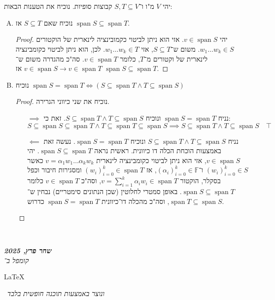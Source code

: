 \documentclass[]{article}
\newcommand\en[1] {\begin{otherlanguage}{english}#1\end{otherlanguage}}
\newcommand\ndoc  {\dotfill \\ \vfil {\begin{center}
			{\textbf{\textit{שחר פרץ, 2025}} \\
				\scriptsize \textit{קומפל ב־}\en{\LaTeX}\,\textit{ ונוצר באמצעות תוכנה חופשית בלבד}}
	\end{center}} \vfil	}
\DeclareMathOperator{\Sp}     {span}
\newcommand\F         {\mathbb{F}}
\newcommand\ag        {\alpha}
\theoremstyle{definition}
\begin{document}
	\section{}
	יהי $V$ מ"ו ו־$S, T \subseteq V$ קבוצות סופיות. נוכיח את הטענות הבאות: 
	\begin{enumerate}[(A)]
		\item נוכיח שאם $S \subseteq T$ אז $\Sp S \subseteq \Sp T$. \begin{proof}
			יהי $v \in \Sp S$. אזי הוא ניתן לביטוי כקמובינציה לינארית של הוקטורים $w_1 \dots w_k \in S$. משום ש־$S \subseteq T$, אזי $w_1 \dots w_k \in T$. לכן, הוא ניתן לביטוי כקומבינציה לינארית של וקטורים מ־$T$, כלומר $v \in \Sp T$. סה"כ מהגדרה משום ש־$v \in \Sp S \rightarrow v \in \Sp T$ אז $\Sp S \subseteq \Sp T$. 
		\end{proof}
		\item נוכיח $\Sp S = \Sp T \iff (S \subseteq \Sp T \land T \subseteq \Sp S)$ \begin{proof}נוכיח את שני כיווני הגרירה. 
			\begin{itemize}
				\item[$\implies$]נניח $\Sp S = \Sp T$ ונוכיח $S \subseteq \Sp T \land T \subseteq \Sp S$. זאת כי: 
				\[ S \subseteq \Sp S \subseteq \Sp T \land T \subseteq \Sp T \subseteq \Sp S \implies S \subseteq \Sp T \land T \subseteq \Sp S \quad \top \]
				\item[$\impliedby$]נניח $S \subseteq \Sp T \land T \subseteq \Sp S$ ונוכיח $\Sp S = \Sp T$. נעשה זאת באמצעות הוכחת הכלה דו כיוונית. ראשית נראה $\Sp S \subseteq \Sp T$. יהי $v \in \Sp S$, אזי הוא ניתן לביטוי כקומבינציה לינארית $v = \ag_1 w_1 \dots \ag_k w_k$ כאשר $(w_i)_{i = 0}^{k} \in S$ ו־$(\ag_i)_{i = 0}^{k} \in \F$, אז $(w_i)_{i = 0}^{k} \in \Sp T$ ומסגירות חיבור וכפל בסקלר, הוקטור $v = \sum_{i = 1}^{k}\ag_i w_i \in \Sp T$, וסה"כ $v \in \Sp T$ כלומר $\Sp S \subseteq \Sp T$. באופן סמטרי לחלוטין (שכן הנתונים סימטריים) נבחין ש־$\Sp T \subseteq \Sp S$, וסה"כ מהכלה דו־כיוונית $\Sp S = \Sp T$ כדרוש. 
			\end{itemize}
		\end{proof}
	\end{enumerate}
	
	\ndoc
\end{document}
